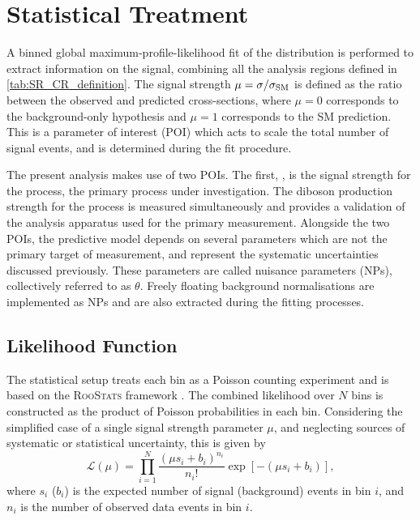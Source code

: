 \section{Statistical Treatment}\label{sec:vhbb_fit}

A binned global maximum-profile-likelihood fit of the \mJ distribution is performed to extract information on the signal, combining all the analysis regions defined in \cref{tab:SR_CR_definition}.
The signal strength $\mu = \sigma / \sigma_{\textnormal{SM}}$ is defined as the ratio between the observed and predicted cross-sections, where $\mu = 0$ corresponds to the background-only hypothesis and $\mu = 1$ corresponds to the SM prediction.
This is a parameter of interest (POI) which acts to scale the total number of signal events, and is determined during the fit procedure.

The present analysis makes use of two POIs.
The first, \muVH, is the signal strength for the \VHbb process, the primary process under investigation.
The diboson production strength \muVZ for the \VZbb process is measured simultaneously and provides a validation of the analysis apparatus used for the primary \Hbb measurement.
Alongside the two POIs, the predictive model depends on several parameters which are not the primary target of measurement, and represent the systematic uncertainties discussed previously.
These parameters are called nuisance parameters (NPs), collectively referred to as $\theta$.
Freely floating background normalisations are implemented as NPs and are also extracted during the fitting processes.


\subsection{Likelihood Function}

The statistical setup treats each bin as a Poisson counting experiment and is based on the \textsc{RooStats} framework \cite{moneta2010roostats}.
The combined likelihood over $N$ bins is constructed as the product of Poisson probabilities in each bin.
Considering the simplified case of a single signal strength parameter $\mu$, and neglecting sources of systematic or statistical uncertainty, this is given by
%
\begin{equation}
    \mathcal{L}(\mu) = \prod_{i=1}^N \frac{(\mu s_i + b_i)^{n_i}}{n_i!} \exp \left[ - (\mu s_i + b_i) \right],
\end{equation}
%
where $s_i$ ($b_i$) is the expected number of signal (background) events in bin $i$, and $n_i$ is the number of observed data events in bin $i$.

